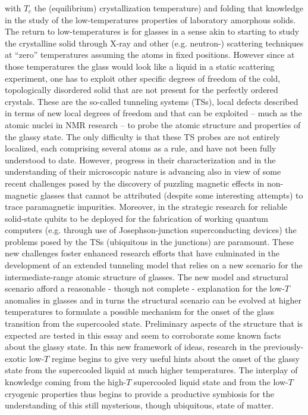 \documentclass[10pt]{article}
\begin{document}
with $T_c$ the (equilibrium) crystallization temperature) and folding that knowledge 
in the study of the low-temperatures properties of laboratory amorphous solids. The 
return to low-temperatures is for glasses in a sense akin to starting to study the 
crystalline solid through X-ray and other (e.g. neutron-) scattering techniques at 
``zero'' temperatures assuming the atoms in fixed positions. However since at those 
temperatures the glass would look like a liquid in a static scattering experiment, one 
has to exploit other specific degrees of freedom of the cold, topologically disordered 
solid that are not present for the perfectly ordered crystals. These are
the so-called tunneling systems (TSs), local defects described in terms of new local 
degrees of freedom and that can be exploited -- much as the atomic nuclei in NMR 
research -- to probe the atomic structure and properties of the glassy state. The only
difficulty is that these TS probes are not entirely localized, each comprising several 
atoms as a rule, and have not been fully understood to date. However, progress in
their characterization and in the understanding of their microscopic nature is 
advancing also in view of some recent challenges posed by the discovery of puzzling
magnetic effects in non-magnetic glasses that cannot be attributed (despite some
interesting attempts) to trace paramagnetic impurities. Moreover, in the strategic
research for reliable solid-state qubits to be deployed for the fabrication of working
quantum computers (e.g. through use of Josephson-junction superconducting 
devices) the problems posed by the TSs (ubiquitous in the junctions) are paramount.
These new challenges foster enhanced research efforts that have culminated in the 
development of an extended tunneling model \cite{Jug2004} that relies on a new 
scenario for the intermediate-range atomic structure of glasses. The new model 
and structural scenario afford a reasonable - though not complete - explanation for 
the low-$T$ anomalies in glasses and in turns the structural scenario can be evolved 
at higher temperatures to formulate a possible mechanism for the onset of the glass 
transition from the supercooled state. Preliminary aspects of the structure that is 
expected are tested in this essay and seem to corroborate some known facts about 
the glassy state. In this new framework of ideas, research in the previously-exotic 
low-$T$ regime begins to give very useful hints about the onset of the glassy state 
from the supercooled liquid at much higher temperatures. The interplay of knowledge 
coming from the high-$T$ supercooled liquid state and from the low-$T$ cryogenic 
properties thus begins to provide a productive symbiosis for the understanding of this 
still mysterious, though ubiquitous, state of matter. 
  
\end{document}
